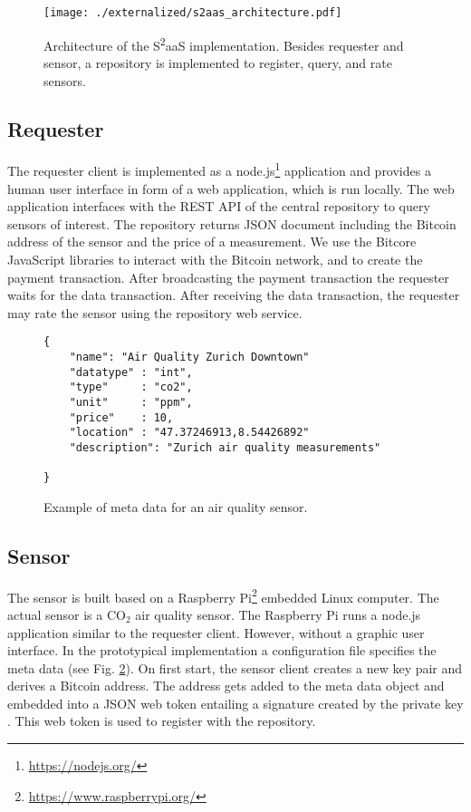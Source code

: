 \begin{figure}
\centering
\texttt{[image: ./externalized/s2aas\_architecture.pdf]}
\caption{Architecture of the S\textsuperscript{2}aaS implementation. Besides requester and sensor, a repository is implemented to register, query, and rate sensors.}
\label{fig:s2aasImplementation}
\end{figure}



\subsection{Requester}

The requester client is implemented as a node.js\footnote{\url{https://nodejs.org/}} application and provides a human user interface in form of a web application, which is run locally. The web application interfaces with the \ac{REST} \ac{API} of the central repository to query sensors of interest. The repository returns \ac{JSON} document including the Bitcoin address of the sensor and the price of a measurement. We use the Bitcore JavaScript libraries to interact with the Bitcoin network, and to create the payment transaction. After broadcasting the payment transaction the requester waits for the data transaction. After receiving the data transaction, the requester may rate the sensor using the repository web service. 

\begin{figure}
\begin{lstlisting}[basicstyle=\ttfamily\small]
{     
    "name": "Air Quality Zurich Downtown"
    "datatype" : "int",
    "type"     : "co2",
    "unit"     : "ppm",
    "price"    : 10,
    "location" : "47.37246913,8.54426892"
    "description": "Zurich air quality measurements"

}
\end{lstlisting}
\caption{Example of meta data for an air quality sensor.}
\label{fig:meta_data}
\end{figure}


\subsection{Sensor}
\label{sec:s2aas_implement_sensor}

The sensor is built based on a Raspberry Pi\footnote{\url{https://www.raspberrypi.org/}} embedded Linux computer. The actual sensor is a CO${_2}$ air quality sensor. The Raspberry Pi runs a node.js application similar to the requester client. However, without a graphic user interface. In the prototypical implementation a configuration file specifies the meta data (see Fig. \ref{fig:meta_data}). On first start, the sensor client creates a new key pair and derives a Bitcoin address. The address gets added to the meta data object and embedded into a \ac{JSON} web token entailing a signature created by the private key \parencite{rfc7515}. This web token is used to register with the repository.

